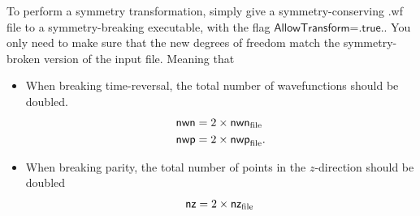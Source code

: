 \documentclass[print,amsmath,amssymb,aps,prc,nofootinbib,notitlepage]{revtex4-1}
\begin{document}
To perform a symmetry transformation, simply give a symmetry-conserving .wf file
to a symmetry-breaking executable, with the flag $\textsf{AllowTransform=.true.}$. 
You only need to make sure that the new degrees of freedom match the symmetry-broken 
version of the input file. Meaning that 
%
\begin{itemize}
\item When breaking time-reversal, the total number of wavefunctions should be doubled. 
     \begin{align*}
      \textsf{nwn} &= 2 \times\textsf{nwn}_{\rm file}  \, \\
      \textsf{nwp} &= 2 \times\textsf{nwp}_{\rm file}  .
     \end{align*}
\item When breaking parity, the total number of points in the $z$-direction should be doubled
     \begin{align*}
      \textsf{nz} &= 2 \times\textsf{nz}_{\rm file}  \, \\
     \end{align*}
\end{itemize}
%
\end{document}
